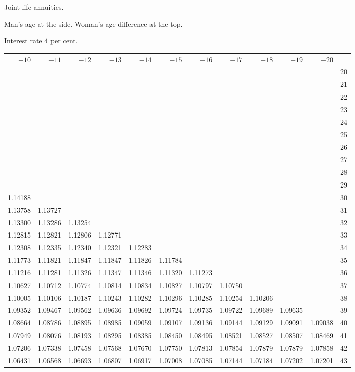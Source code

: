 \clearpage
{}
\begin{center}
Joint life annuities.\par\smallskip
Man's age at the side. Woman's age difference at the top.\par\smallskip
Interest rate \(4\) per cent.\par\medskip
\fontsize{8}{10}\selectfont\setlength{\tabcolsep}{1.3pt}
\begin{tabular}{|rrrrrrrrrrr|r|}
\hline
\(-10\)&\(-11\)&\(-12\)&\(-13\)&\(-14\)&\(-15\)&\(-16\)&\(-17\)&\(-18\)&\(-19\)&\(-20\)&\\[8pt]
&&&&&&&&&&&20\\
&&&&&&&&&&&21\\
&&&&&&&&&&&22\\
&&&&&&&&&&&23\\
&&&&&&&&&&&24\\[5pt]
&&&&&&&&&&&25\\
&&&&&&&&&&&26\\
&&&&&&&&&&&27\\
&&&&&&&&&&&28\\
&&&&&&&&&&&29\\[5pt]
1.14188&&&&&&&&&&&30\\
1.13758&1.13727&&&&&&&&&&31\\
1.13300&1.13286&1.13254&&&&&&&&&32\\
1.12815&1.12821&1.12806&1.12771&&&&&&&&33\\
1.12308&1.12335&1.12340&1.12321&1.12283&&&&&&&34\\[5pt]
1.11773&1.11821&1.11847&1.11847&1.11826&1.11784&&&&&&35\\
1.11216&1.11281&1.11326&1.11347&1.11346&1.11320&1.11273&&&&&36\\
1.10627&1.10712&1.10774&1.10814&1.10834&1.10827&1.10797&1.10750&&&&37\\
1.10005&1.10106&1.10187&1.10243&1.10282&1.10296&1.10285&1.10254&1.10206&&&38\\
1.09352&1.09467&1.09562&1.09636&1.09692&1.09724&1.09735&1.09722&1.09689&1.09635&&39\\[5pt]
1.08664&1.08786&1.08895&1.08985&1.09059&1.09107&1.09136&1.09144&1.09129&1.09091&1.09038&40\\
1.07949&1.08076&1.08193&1.08295&1.08385&1.08450&1.08495&1.08521&1.08527&1.08507&1.08469&41\\
1.07206&1.07338&1.07458&1.07568&1.07670&1.07750&1.07813&1.07854&1.07879&1.07879&1.07858&42\\
1.06431&1.06568&1.06693&1.06807&1.06917&1.07008&1.07085&1.07144&1.07184&1.07202&1.07201&43\\

\end{tabular}
\end{center}
